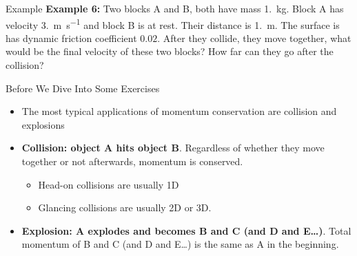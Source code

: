 \documentclass[12pt,compress,aspectratio=169]{beamer}
\begin{document}
\begin{frame}{Example}
  \textbf{Example 6:} Two blocks A and B, both have mass \SI{1.}{\kilo\gram}.
  Block A has velocity \SI{3.}{\metre\per\second} and block B is at rest. Their
  distance is \SI{1.}{\metre}. The surface is has dynamic friction coefficient
  $0.02$. After they collide, they move together, what would be the final
  velocity of these two blocks? How far can they go after the collision?
\end{frame}

%


\begin{frame}{Before We Dive Into Some Exercises}
  \begin{itemize}
  \item The most typical applications of momentum conservation are collision
    and explosions
  \item\textbf{Collision: object A hits object B}. Regardless of whether they
    move together or not afterwards, momentum is conserved.
    \begin{itemize}
    \item Head-on collisions are usually 1D
    \item Glancing collisions are usually 2D or 3D.
    \end{itemize}
  \item\textbf{Explosion: A explodes and becomes B and C (and D and E\ldots)}.
    Total momentum of B and C (and D and E\ldots) is the same as A in the
    beginning. 
  \end{itemize}
\end{frame}
\end{document}
